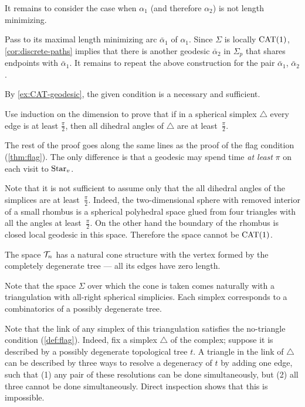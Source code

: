 It remains to consider the case when $\alpha_1$ (and therefore $\alpha_2$) is not length minimizing.

Pass to its maximal length minimizing arc $\bar\alpha_1$ of $\alpha_1$.
Since $\Sigma$ is locally $\mathrm{CAT}(1)$, \ref{cor:discrete-paths} implies that 
there is another geodesic $\bar\alpha_2$ in $\Sigma_p$ that shares endpoints with $\bar\alpha_1$.
It remains to repeat the above construction for the pair $\bar\alpha_1$, $\bar\alpha_2$.


By \ref{ex:CAT-geodesic}, the given condition is a necessary and sufficient.

Use induction on the dimension  to prove that if in a spherical simplex $\triangle$ every edge is at least $\tfrac\pi2$, then 
all dihedral angles of $\triangle$ are at least~$\tfrac\pi2$.

The rest of the proof goes along the same lines as the proof of the flag condition (\ref{thm:flag}).
The only difference is that a geodesic may spend time \textit{at least} $\pi$ on each visit to $\mathop{\rm Star}\nolimits_v$.

Note that it is not sufficient to assume only that the all dihedral angles of the simplices are at least~$\tfrac\pi2$. 
Indeed, the two-dimensional sphere with removed interior of a small rhombus is a spherical polyhedral space glued from four triangles with all the angles at least~$\tfrac\pi2$.
On the other hand the boundary of the rhombus is closed local geodesic in this space.
Therefore the space cannot be $\mathrm{CAT}(1)$.

The space $\mathcal{T}_n$ has a natural cone structure with the vertex formed by the  completely degenerate tree --- all its edges have zero length.

Note that the space $\Sigma$
over which the cone is taken comes naturally with a triangulation 
with all-right spherical simplicies.
Each simplex corresponds to a combinatorics of a possibly degenerate tree.

Note that the link of any simplex of this triangulation satisfies the no-triangle condition (\ref{def:flag}).
Indeed, fix a simplex $\triangle$ of the complex;
suppose it is described by a possibly degenerate topological tree $t$.
A triangle in the link of  $\triangle$ can be described by three ways to resolve a degeneracy of $t$ by adding one edge,
such that (1) any pair of these resolutions can be done simultaneously, but (2) all three cannot be done simultaneously.
Direct inspection shows that this is impossible.

